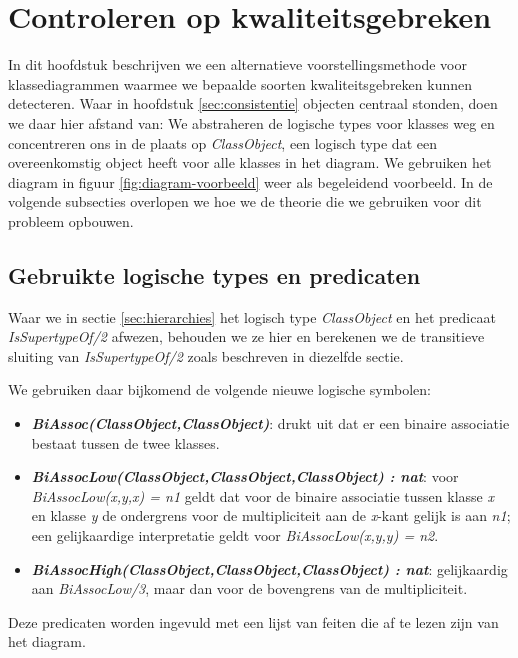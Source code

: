\chapter{Controleren op kwaliteitsgebreken}\label{sec:kwaliteitsgebrek}
In dit hoofdstuk beschrijven we een alternatieve voorstellingsmethode voor klassediagrammen waarmee we bepaalde soorten kwaliteitsgebreken kunnen detecteren. Waar in hoofdstuk \ref{sec:consistentie} objecten centraal stonden, doen we daar hier afstand van: We abstraheren de logische types voor klasses weg en concentreren ons in de plaats op \textit{ClassObject}, een logisch type dat een overeenkomstig object heeft voor alle klasses in het diagram. We gebruiken het diagram in figuur \ref{fig:diagram-voorbeeld} weer als begeleidend voorbeeld. In de volgende subsecties overlopen we hoe we de theorie die we gebruiken voor dit probleem opbouwen.

\section{Gebruikte logische types en predicaten}
\sloppy Waar we in sectie \ref{sec:hierarchies} het logisch type \textit{ClassObject} en het predicaat \\ \textit{IsSupertypeOf/2} afwezen, behouden we ze hier en berekenen we de transitieve sluiting van \textit{IsSupertypeOf/2} zoals beschreven in diezelfde sectie.

We gebruiken daar bijkomend de volgende nieuwe logische symbolen:

\begin{itemize}
	\item \textbf{\textit{BiAssoc(ClassObject,ClassObject)}}: drukt uit dat er een binaire associatie bestaat tussen de twee klasses.
	\item \sloppy \textbf{\textit{BiAssocLow(ClassObject,ClassObject,ClassObject) : nat}}: voor \\ \textit{BiAssocLow(x,y,x) = n1} geldt dat voor de binaire associatie tussen klasse \textit{x} en klasse \textit{y} de ondergrens voor de multipliciteit aan de \textit{x}-kant gelijk is aan \textit{n1}; een gelijkaardige interpretatie geldt voor \textit{BiAssocLow(x,y,y) = n2}.
	\item \textbf{\textit{BiAssocHigh(ClassObject,ClassObject,ClassObject) : nat}}: gelijkaardig aan \textit{BiAssocLow/3}, maar dan voor de bovengrens van de multipliciteit.
\end{itemize}

Deze predicaten worden ingevuld met een lijst van feiten die af te lezen zijn van het diagram.

